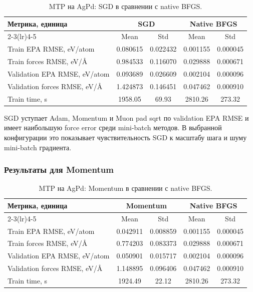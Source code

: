\begin{table}[H]
\centering
\small
\caption{MTP на AgPd: SGD в сравнении с native BFGS.}
\label{tab:mtp-sgd}
\begin{tabular}{lcccc}
\toprule
\multirow{2}{*}{Метрика, единица} & \multicolumn{2}{c}{SGD} & \multicolumn{2}{c}{Native BFGS} \\
\cmidrule(lr){2-3}\cmidrule(lr){4-5}
 & Mean & Std & Mean & Std \\
\midrule
Train EPA RMSE, eV/atom & 0.080615 & 0.022432 & 0.001155 & 0.000045 \\
Train forces RMSE, eV/\AA & 0.984533 & 0.116070 & 0.029888 & 0.000671 \\
Validation EPA RMSE, eV/atom & 0.093689 & 0.026609 & 0.002104 & 0.000096 \\
Validation forces RMSE, eV/\AA & 1.424873 & 0.146451 & 0.047462 & 0.000910 \\
Train time, s & 1958.05 & 69.93 & 2810.26 & 273.32 \\
\bottomrule
\end{tabular}
\end{table}


SGD уступает Adam, Momentum и Muon pad sqrt по validation EPA RMSE и имеет наибольшую force error среди mini-batch методов. В выбранной конфигурации это показывает чувствительность SGD к масштабу шага и шуму mini-batch градиента.

\FloatBarrier

\subsubsection{Результаты для Momentum}

\begin{table}[H]
\centering
\small
\caption{MTP на AgPd: Momentum в сравнении с native BFGS.}
\label{tab:mtp-momentum}
\begin{tabular}{lcccc}
\toprule
\multirow{2}{*}{Метрика, единица} & \multicolumn{2}{c}{Momentum} & \multicolumn{2}{c}{Native BFGS} \\
\cmidrule(lr){2-3}\cmidrule(lr){4-5}
 & Mean & Std & Mean & Std \\
\midrule
Train EPA RMSE, eV/atom & 0.042911 & 0.008859 & 0.001155 & 0.000045 \\
Train forces RMSE, eV/\AA & 0.774203 & 0.083373 & 0.029888 & 0.000671 \\
Validation EPA RMSE, eV/atom & 0.050901 & 0.015717 & 0.002104 & 0.000096 \\
Validation forces RMSE, eV/\AA & 1.148895 & 0.096406 & 0.047462 & 0.000910 \\
Train time, s & 1924.49 & 22.12 & 2810.26 & 273.32 \\
\bottomrule
\end{tabular}
\end{table}


